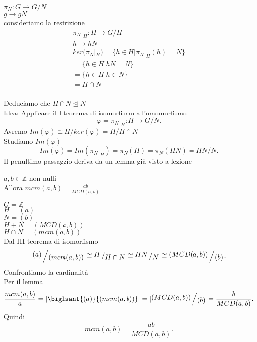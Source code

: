 \documentclass[12px]{article}
\begin{document}
		\begin{dimo}
			$\pi_N:G \rightarrow G/N$\\
			$g \rightarrow gN$\\
			consideriamo la restrizione\\
			\begin{gather*}
				\pi_N|_H:H \rightarrow G/H\\
				h \rightarrow hN\\
				ker (\pi_N|_H) = \{h\in H| \pi_N|_H(h) = N\}\\
					       =\{h\in H|hN = N\}\\
					       =\{h\in H| h\in N\}\\
					       =H\cap N
			\end{gather*}\\
			Deduciamo che $H\cap N\trianglelefteq N$\\
			Idea: Applicare il I teorema di isomorfismo all'omomorfismo
			 \[
			\varphi=\pi_N|_H:H \rightarrow G/N
			.\] 
			Avremo $Im( \varphi)\cong H/ker( \varphi) = H/H\cap N$\\
			Studiamo $Im( \varphi)$\\
	\[
	Im( \varphi) = Im( \pi_N|_H) = \pi_N(H) = \pi_N(HN) = HN/N
	.\] 
	Il penultimo passaggio deriva da un lemma già visto a lezione
		\end{dimo}
		\newpage
		\begin{coro}
			$a,b\in \mathbb Z$ non nulli\\
			Allora $mcm(a,b) = \frac {ab} {MCD(a,b)}$
		\end{coro}
		\begin{dimo}
			$G = \mathbb Z$ \\
			$H = (a)$\\
			 $N= (b)$\\
			  $H+N = (MCD(a,b))$\\
			   $H\cap N = (mcm(a,b))$\\
		Dal III teorema di isomorfismo 
		 \[
			 \bigslant{(a)}{(mcm(a,b))}\cong \bigslant H {H\cap N}\cong \bigslant {HN} N \cong \bigslant{(MCD(a,b))}{(b)}
		.\] 
		Confrontiamo la cardinalità\\
		Per il lemma\\
		\[
			\frac {mcm(a,b)}{a} = |\biglsant {(a)}{(mcm(a,b))}| = |\bigslant {(MCD(a,b))}{(b)} = \frac {b}{MCD(a,b)}
		.\] 
		Quindi 
		\[
			mcm(a,b) = \frac {ab}{MCD(a,b)}
		.\] 
		\end{dimo}
\end{document}
